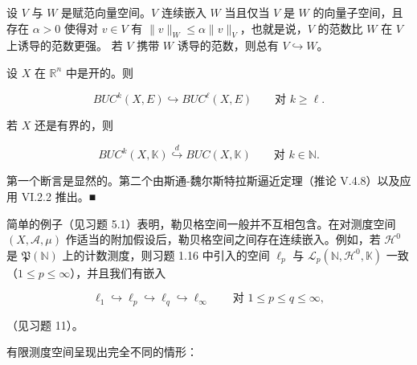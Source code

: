 \begin{remark}

\begin{items}
\item

设 $ V $ 与 $ W $ 是赋范向量空间。$ V $ 连续嵌入 $ W $ 当且仅当 $ V $ 是 $ W $ 的向量子空间，且存在 $ \alpha > 0 $ 使得对 $ v \in V $ 有 $ \|v\|_W \le \alpha \|v\|_V $，也就是说，$ V $ 的范数比 $ W $ 在 $ V $ 上诱导的范数更强。
若 $ V $ 携带 $ W $ 诱导的范数，则总有 $ V \hookrightarrow W $。

\item

设 $ X $ 在 $ \mathbb{R}^n $ 中是开的。则

\[
BUC^k(X, E) \hookrightarrow BUC^\ell(X, E) \qquad \text{对 } k \ge \ell .
\]

若 $ X $ 还是有界的，则

\[
BUC^k(X, \mathbb{K}) \overset{d}{\hookrightarrow} BUC(X, \mathbb{K}) \qquad \text{对 } k \in \mathbb{N} .
\]

\proofhead
第一个断言是显然的。第二个由斯通-魏尔斯特拉斯逼近定理（推论 V.4.8）以及应用 VI.2.2 推出。\nobreak\hspace{0.35em}■
\end{items}

简单的例子（见习题 5.1）表明，勒贝格空间一般并不互相包含。在对测度空间 $ (X, \mathcal{A}, \mu) $ 作适当的附加假设后，勒贝格空间之间存在连续嵌入。例如，若 $ \mathcal{H}^0 $ 是 $ \mathfrak{P}(\mathbb{N}) $ 上的计数测度，则习题 1.16 中引入的空间 $ \ell_p $ 与 $ \mathcal{L}_p(\mathbb{N}, \mathcal{H}^0, \mathbb{K}) $ 一致（$ 1 \le p \le \infty $），并且我们有嵌入

\[
\ell_1 \hookrightarrow \ell_p \hookrightarrow \ell_q \hookrightarrow \ell_\infty \qquad \text{对 } 1 \le p \le q \le \infty ,
\]

（见习题 11）。

有限测度空间呈现出完全不同的情形：

\end{remark}

